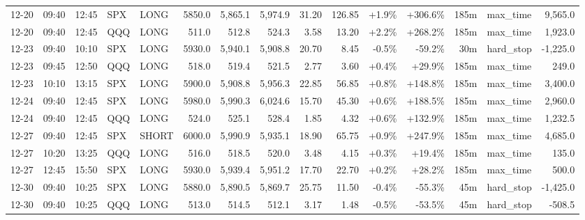 \documentclass[11pt,a4paper,twoside]{article}
\begin{document}
\begin{landscape}
\begin{center}
\begin{longtable}{>{\color{txtmain}}l l l l l r r r r r r r r >{\color{txtmain}}l r}
12-20 & 09:40 & 12:45 & SPX & LONG & 5850.0 & 5,865.1 & 5,974.9 & 31.20 & 126.85 & \textcolor{wingreen}{+1.9\%} & \textcolor{wingreen}{+306.6\%} & 185m & max\_time & \textcolor{wingreen}{9,565.0} \\
12-20 & 09:40 & 12:45 & QQQ & LONG & 511.0 & 512.8 & 524.3 & 3.58 & 13.20 & \textcolor{wingreen}{+2.2\%} & \textcolor{wingreen}{+268.2\%} & 185m & max\_time & \textcolor{wingreen}{1,923.0} \\
12-23 & 09:40 & 10:10 & SPX & LONG & 5930.0 & 5,940.1 & 5,908.8 & 20.70 & 8.45 & \textcolor{lossred}{-0.5\%} & \textcolor{lossred}{-59.2\%} & 30m & hard\_stop & \textcolor{lossred}{-1,225.0} \\
12-23 & 09:45 & 12:50 & QQQ & LONG & 518.0 & 519.4 & 521.5 & 2.77 & 3.60 & \textcolor{wingreen}{+0.4\%} & \textcolor{wingreen}{+29.9\%} & 185m & max\_time & \textcolor{wingreen}{249.0} \\
12-23 & 10:10 & 13:15 & SPX & LONG & 5900.0 & 5,908.8 & 5,956.3 & 22.85 & 56.85 & \textcolor{wingreen}{+0.8\%} & \textcolor{wingreen}{+148.8\%} & 185m & max\_time & \textcolor{wingreen}{3,400.0} \\
12-24 & 09:40 & 12:45 & SPX & LONG & 5980.0 & 5,990.3 & 6,024.6 & 15.70 & 45.30 & \textcolor{wingreen}{+0.6\%} & \textcolor{wingreen}{+188.5\%} & 185m & max\_time & \textcolor{wingreen}{2,960.0} \\
12-24 & 09:40 & 12:45 & QQQ & LONG & 524.0 & 525.1 & 528.4 & 1.85 & 4.32 & \textcolor{wingreen}{+0.6\%} & \textcolor{wingreen}{+132.9\%} & 185m & max\_time & \textcolor{wingreen}{1,232.5} \\
12-27 & 09:40 & 12:45 & SPX & SHORT & 6000.0 & 5,990.9 & 5,935.1 & 18.90 & 65.75 & \textcolor{wingreen}{+0.9\%} & \textcolor{wingreen}{+247.9\%} & 185m & max\_time & \textcolor{wingreen}{4,685.0} \\
12-27 & 10:20 & 13:25 & QQQ & LONG & 516.0 & 518.5 & 520.0 & 3.48 & 4.15 & \textcolor{wingreen}{+0.3\%} & \textcolor{wingreen}{+19.4\%} & 185m & max\_time & \textcolor{wingreen}{135.0} \\
12-27 & 12:45 & 15:50 & SPX & LONG & 5930.0 & 5,939.4 & 5,951.2 & 17.70 & 22.70 & \textcolor{wingreen}{+0.2\%} & \textcolor{wingreen}{+28.2\%} & 185m & max\_time & \textcolor{wingreen}{500.0} \\
12-30 & 09:40 & 10:25 & SPX & LONG & 5880.0 & 5,890.5 & 5,869.7 & 25.75 & 11.50 & \textcolor{lossred}{-0.4\%} & \textcolor{lossred}{-55.3\%} & 45m & hard\_stop & \textcolor{lossred}{-1,425.0} \\
12-30 & 09:40 & 10:25 & QQQ & LONG & 513.0 & 514.5 & 512.1 & 3.17 & 1.48 & \textcolor{lossred}{-0.5\%} & \textcolor{lossred}{-53.5\%} & 45m & hard\_stop & \textcolor{lossred}{-508.5} \\

\end{longtable}
\end{center}
\end{landscape}
\end{document}

